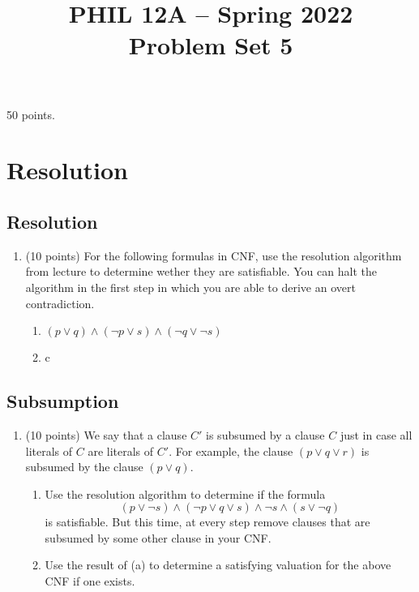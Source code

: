 \documentclass[english]{article}
\theoremstyle{definition}
\begin{document}
 

 \title{PHIL 12A -- Spring 2022 \\ Problem Set 5}
\date{}

\maketitle


\begin{center}50 points.\end{center}

\setcounter{section}{0}

\section{Resolution}

\subsection{Resolution}

\begin{enumerate}[label=\arabic*.,ref=\arabic*,resume]
\item (10 points) For the following formulas in CNF, use the resolution algorithm from lecture to determine wether they are satisfiable. You can halt the algorithm in the first step in which you are able to derive an overt contradiction. 
\begin{enumerate}
\item $(p \lor q) \land (\neg p \lor s) \land (\neg q \lor \neg s) $
\item c
\end{enumerate}
\end{enumerate}

\subsection{Subsumption}

\begin{enumerate}[label=\arabic*.,ref=\arabic*,resume]
\item (10 points) We say that a clause $C'$ is subsumed by a clause $C$  just in case all literals of $C$ are literals of $C'$.  For example, the clause $(p\vee q\vee r)$ is subsumed by the clause $(p\vee q)$.
\begin{enumerate}
\item Use the resolution algorithm to determine if the formula
\[ 
(p \lor \neg s) \land (\neg p \lor q \lor s) \land \neg s \land (s \lor \neg q) 
\]
is satisfiable. But this time, at every step remove clauses that are subsumed by some other clause in your CNF. 
\item Use the result of (a) to determine a satisfying valuation for the above CNF if one exists. 
\end{enumerate} 
\end{enumerate}
\end{document}
